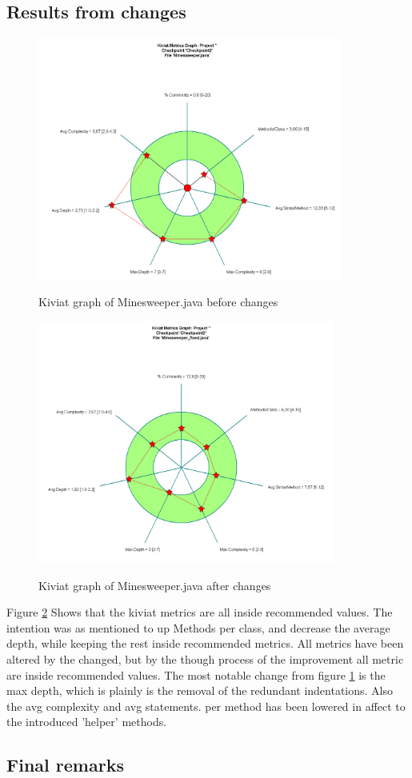 \documentclass[UKenglish]{article}  %
\begin{document}
\subsection{Results from changes}
\begin{figure}
	\caption{Kiviat graph of Minesweeper.java before changes}
	\includegraphics[height=8cm]{kiviat_minesweeper_before}
	\label{minesweeper_before}
\end{figure}

\begin{figure}
	\caption{Kiviat graph of Minesweeper.java after changes}
	\includegraphics[height=8cm]{kiviat_minesweeper_after}
	\label{minesweeper_after}
\end{figure}

Figure \ref{minesweeper_after} Shows that the kiviat metrics are all inside 
recommended values. The intention was as mentioned to up Methods per class, and decrease
the average depth, while keeping the rest inside recommended metrics. All
metrics have been altered by the changed, but by the though process of the
improvement all metric are inside recommended values. The most notable change
from figure \ref{minesweeper_before} is the max depth, which is plainly is the
removal of the redundant indentations. Also the avg complexity and avg 
statements.
per method has been lowered in affect to the introduced 'helper' methods. 

\subsection{Final remarks}
\end{document}
